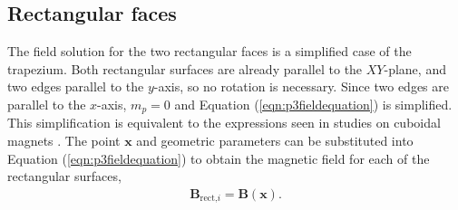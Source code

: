\subsection{Rectangular faces}\label{sec:p3rectFaces}
The field solution for the two rectangular faces is a simplified case of the trapezium. Both rectangular surfaces are already parallel to the \(XY\)-plane, and two edges parallel to the \(y\)-axis, so no rotation is necessary. Since two edges are parallel to the \(x\)-axis, \(m_p = 0\) and Equation (\ref{eqn:p3fieldequation}) is simplified. This simplification is equivalent to the expressions seen in studies on cuboidal magnets \cite{Akoun1984,Ravaud2009a}. The point \(\mathbf{x}\) and geometric parameters can be substituted into Equation (\ref{eqn:p3fieldequation}) to obtain the magnetic field for each of the rectangular surfaces,
\begin{align}
\mathbf{B}_{\text{rect,}i} = \mathbf{B}\left(\mathbf{x}\right) \text{.}
\end{align}


